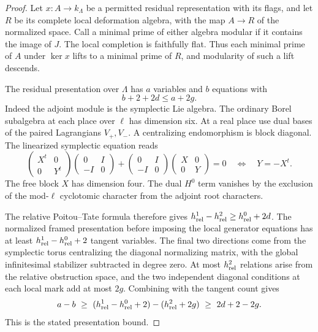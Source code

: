 \begin{proof}

Let \(x:A\to k_\Lambda\) be a permitted residual representation
with its flags, and let \(R\) be its complete local deformation
algebra, with the map \(A\to R\) of the normalized space.
Call a minimal prime of either algebra modular if it contains
the image of \(J\). The local completion is faithfully flat.
Thus each minimal prime of \(A\) under \(\ker x\) lifts to a
minimal prime of \(R\), and modularity of such a lift descends.

The residual presentation over \(\Lambda\) has \(a\) variables
and \(b\) equations with
\[
                      b+2+2d\leq a+2g .
\]
Indeed the adjoint module is the symplectic Lie algebra. The
ordinary Borel subalgebra at each place over \(\ell\) has
dimension six. At a real place use dual bases of the paired Lagrangians \(V_+,V_-\). A centralizing endomorphism is block diagonal. The linearized symplectic equation reads
\[
 \begin{pmatrix}X^t&0\\0&Y^t\end{pmatrix}
 \begin{pmatrix}0&I\\-I&0\end{pmatrix}
 +\begin{pmatrix}0&I\\-I&0\end{pmatrix}
  \begin{pmatrix}X&0\\0&Y\end{pmatrix}=0
 \quad\Longleftrightarrow\quad Y=-X^t .
\]
The free block \(X\) has dimension four. The dual \(H^0\) term vanishes by the exclusion
of the mod-\(\ell\) cyclotomic character from the adjoint root
characters.

The relative Poitou--Tate formula therefore gives
\(h^1_{\rm rel}-h^2_{\rm rel}\geq h^0_{\rm rel}+2d\).
The normalized framed presentation before imposing the local
generator equations has at least
\(h^1_{\rm rel}-h^0_{\rm rel}+2\) tangent variables.
The final two directions come from the symplectic torus
centralizing the diagonal normalizing matrix, with the
global infinitesimal stabilizer subtracted in degree zero.
At most \(h^2_{\rm rel}\) relations arise from the
relative obstruction space, and the two independent diagonal
conditions at each local mark add at most \(2g\).
Combining with the tangent count gives
\[
 a-b
 \ \ge\ (h^1_{\rm rel}-h^0_{\rm rel}+2)-(h^2_{\rm rel}+2g)
 \ \ge\ 2d+2-2g .
\]
This is the stated presentation bound.


\end{proof}
